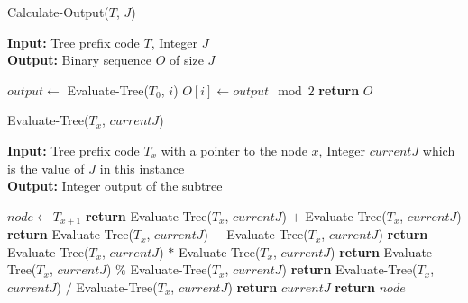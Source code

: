 \documentclass[a4paper,10.5pt]{article}
\begin{document}
\begin{algorithm}[H]
  \caption{Calculate-Output($T$, $J$)}
  \textbf{Input:} Tree prefix code $T$, Integer $J$\\ 
  \textbf{Output:} Binary sequence $O$ of size $J$\\

  \begin{algorithmic}[1]
	\State $output \gets$ Evaluate-Tree($T_0$, $i$)
	\State $O[i] \gets output\mod 2$
 \EndFor
\State \textbf{return} $O$
  \end{algorithmic}
\end{algorithm}

\begin{algorithm}[H]
  \caption{Evaluate-Tree($T_{x}$, $currentJ$)}
  \textbf{Input:} Tree prefix code $T_{x}$ with a pointer to the node $x$, Integer $currentJ$ which is the value of $J$ in this instance\\ 
  \textbf{Output:} Integer output of the subtree\\ 
	
  \begin{algorithmic}[1]
  \State $node \gets T_{x+1}$
	\State \textbf{return} Evaluate-Tree($T_{x}$, $currentJ$) $+$ Evaluate-Tree($T_{x}$, $currentJ$)
	\State \textbf{return} Evaluate-Tree($T_{x}$, $currentJ$) $-$ Evaluate-Tree($T_{x}$, $currentJ$)
	\State \textbf{return} Evaluate-Tree($T_{x}$, $currentJ$) $*$ Evaluate-Tree($T_{x}$, $currentJ$)
	\State \textbf{return} Evaluate-Tree($T_{x}$, $currentJ$) $\%$ Evaluate-Tree($T_{x}$, $currentJ$)
	\State \textbf{return} Evaluate-Tree($T_{x}$, $currentJ$) $/$ Evaluate-Tree($T_{x}$, $currentJ$)
	\State \textbf{return} $currentJ$
  \Else
	\State \textbf{return} $node$ 
  \EndIf
  \end{algorithmic}
\end{algorithm}
\end{document}
